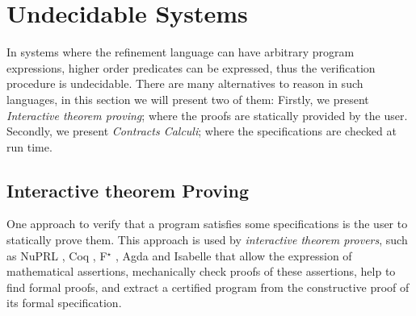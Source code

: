 \newcommand\labelcolor{OliveGreen}


\newcommand\trefc[4]{
\ensuremath{
  \langle
	\texttt{\{#1:} #2  \texttt{|} #3 \texttt{\}}
  \rangle
	^{\color{\labelcolor}#4}
}}

\newcommand\mklabel[1]{\color{\labelcolor}{#1}}


\newcommand\trefint[2]{\trefc{v}{{\color{colorint}\texttt{Int}}}{#1}{#2}}
\newcommand\trefpos[1]{\trefint{v>0}{#1}}

\newcommand\tyint{{\color{colorint}\texttt{Int}}}
\newcommand\ttpos{
\texttt{\{v:{\color{colorint}Int}|v > 0\}}
}

\newcommand\ttpred[1]{
\texttt{\{v:{\color{colorint}Int}|v = #1 - 1\}}
}

\newcommand\tteq[1]{
\texttt{\{v:{\color{colorint}Int}|v = #1\}}
}

\newcommand\tlabel{T-Label}
\newcommand\tcast{T-Cast}

\newcommand\cbase{C-Base}
\newcommand\cfunction{C-Fun}


\newcommand\predname{{\color{blue}\texttt{pred}}}
\newcommand\prednamep{{\color{blue}\texttt{pred'}}}

\newcommand\elabel[1]{\ensuremath{\Uparrow \mklabel{#1}}}
\newcommand\ecast[3]{\ensuremath{\langle #1 \Rightarrow #2 \rangle^{\mklabel{#3}}}}

\newcommand\isCompatible[2]{\ensuremath{ #1 \Vert #2 }}

\section{Undecidable Systems}\label{sec:undec}

In systems where the refinement language can have arbitrary program expressions,
higher order predicates can be expressed, thus the verification procedure is undecidable.
%
There are many alternatives to reason in such languages, 
in this section we will present two of them:
Firstly, we present \textit{Interactive theorem proving};
where the proofs are statically provided by the user.
Secondly, we present \textit{Contracts Calculi}; 
where the specifications are checked at run time.

\subsection{Interactive theorem Proving}
One approach to verify that a program satisfies some 
specifications is the user to statically prove them.
% 
This approach is used by \textit{interactive theorem provers}, 
such as 
NuPRL \cite{Constable86},
Coq \cite{coq-book}, F$^\star$ \cite{SwamyCFSBY11}, Agda \cite{norell07}
and Isabelle \cite{NPW2002}
that allow the 
expression of mathematical assertions, 
mechanically check proofs of these assertions, 
help to find formal proofs, 
and extract a certified program from 
the constructive proof of its formal specification.


